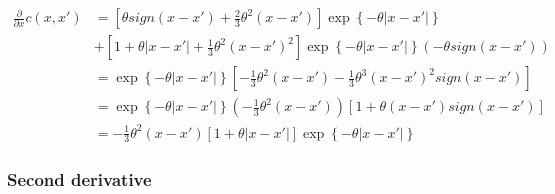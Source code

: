 \documentclass{sfuthesis}
\begin{document}
\begin{align}
\frac{\partial }{{\partial x}}c\left( {x,x'} \right) &= \left[ {\theta sign\left( {x - x'} \right) + \frac{2}{3}{\theta ^2}\left( {x - x'} \right)} \right]\exp \left\{ { - \theta \left| {x - x'} \right|} \right\}\\
 &+ \left[ {1 + \theta \left| {x - x'} \right| + \frac{1}{3}{\theta ^2}{{\left( {x - x'} \right)}^2}} \right]\exp \left\{ { - \theta \left| {x - x'} \right|} \right\}\left( { - \theta sign\left( {x - x'} \right)} \right)\\
 &= \exp \left\{ { - \theta \left| {x - x'} \right|} \right\}\left[ { - \frac{1}{3}{\theta ^2}\left( {x - x'} \right) - \frac{1}{3}{\theta ^3}{{\left( {x - x'} \right)}^2}sign\left( {x - x'} \right)} \right]\\
 &= \exp \left\{ { - \theta \left| {x - x'} \right|} \right\}\left( { - \frac{1}{3}{\theta ^2}\left( {x - x'} \right)} \right)\left[ {1 + \theta \left( {x - x'} \right)sign\left( {x - x'} \right)} \right]\\
 &=  - \frac{1}{3}{\theta ^2}\left( {x - x'} \right)\left[ {1 + \theta \left| {x - x'} \right|} \right]\exp \left\{ { - \theta \left| {x - x'} \right|} \right\}
\end{align}


\bigskip

\subsubsection{Second derivative}
\end{document}
